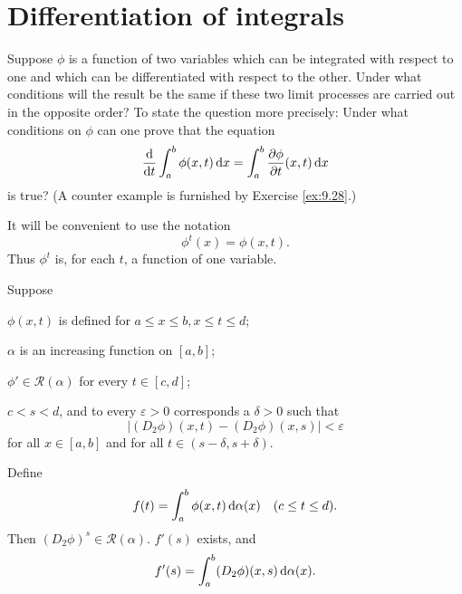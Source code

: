 
\section{Differentiation of integrals}

Suppose $\phi$ is a function of two variables
which can be integrated with respect to one
and which can be differentiated with respect to the other.
Under what conditions will the result be the same
if these two limit processes are carried out in the opposite order?
To state the question more precisely: Under what
conditions on $\phi$ can one prove that the equation
\begin{equation}
    \label{eq:9.98}
    \frac{\d}{\d t} \int_{a}^{b} \phi (x,t) \d x =
    \int_{a}^{b} \frac{\partial \phi}{\partial t}(x,t) \d x
\end{equation}
is true?
(A counter example is furnished by Exercise \ref{ex:9.28}.)

It will be convenient to use the notation
\begin{equation}
    \label{eq:9.99}
    \phi^t(x) = \phi (x, t).
\end{equation}
Thus $\phi^t$ is, for each $t$, a function of one variable.

\begin{thm}
    \label{thm:9.42}
    Suppose
    \begin{asparaenum}[(a)]
        \item $\phi(x,t)$ is defined for $a \leq x \leq b,x \leq t \leq d$;
        \item $\alpha$ is an increasing function on $[a,b]$;
        \item $\phi' \in \mathscr{R}(\alpha)$ for every $t \in [c,d]$;
        \item $c<s<d$, and to every $\varepsilon > 0$ corresponds a $\delta > 0$ such that
        \begin{equation*}
            \left| (D_2 \phi)(x,t) - (D_2 \phi)(x,s) \right| < \varepsilon
        \end{equation*}
        for all $x \in [a,b]$ and for all $t \in (s-\delta, s+\delta)$.
    \end{asparaenum}
    Define
    \begin{equation}
        \label{eq:9.100}
        f(t) = \int_{a}^{b} \phi(x,t) \d \alpha(x)
        \quad
        (c \leq t \leq d) .
    \end{equation}
    Then $(D_2 \phi)^s \in \mathscr{R}(\alpha)$. $f'(s)$ exists, and
    \begin{equation}
        \label{eq:9.101}
        f'(s) = \int_{a}^{b} (D_2 \phi)(x,s) \d \alpha(x).
    \end{equation}
\end{thm}

